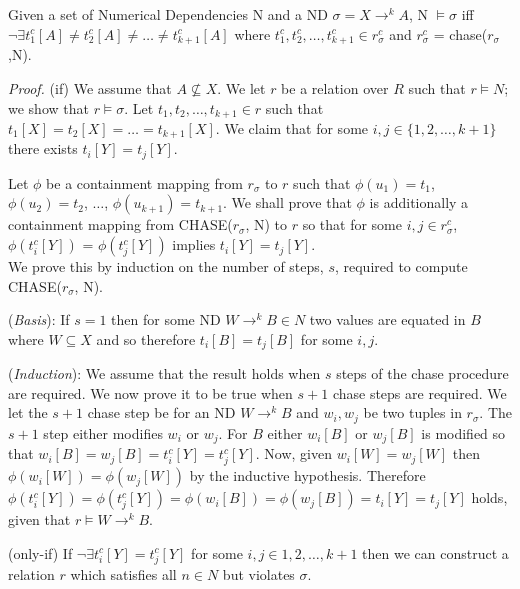 \begin{theorem}\label{th:2}
\begin{rm}
Given a set of Numerical Dependencies N and a ND $\sigma = X \to^k A$,
N $\models \sigma$ iff $\neg\exists t^c_1[A] \not= t^c_2[A] \not= \ldots
\not= t^c_{k+1}[A]$ where $t^c_1,t^c_2,\ldots,t^c_{k+1} \in
r_\sigma^c$ and $r_\sigma^c$ = chase($r_\sigma$,N).
\end{rm}
\end{theorem}

{\em Proof.} (if) We assume that $A \not\subseteq X$. We let $r$ be a
relation over $R$ such that $r \models N$; we show that $r \models
\sigma$. Let $t_1, t_2, \ldots, t_{k+1} \in r$ such that $t_1[X] =
t_2[X] = \ldots = t_{k+1}[X]$. We claim that for some $i,
j \in \{1, 2, \ldots, {k+1}\}$ there exists $t_i[Y] = t_j[Y]$.

\smallskip
Let $\phi$ be a containment mapping from $r_\sigma$ to $r$ such that
$\phi(u_1) = t_1$, $\phi(u_2) = t_2$, $\ldots$, $\phi(u_{k+1}) = t_{k+1}$. We
shall prove that $\phi$ is additionally a containment mapping from
CHASE($r_\sigma$, N) to $r$ so that for some $i,j \in r_\sigma^c$,
$\phi(t_i^c[Y])$ = $\phi(t_j^c[Y])$ implies $t_i[Y] = t_j[Y]$.\\
\smallskip
We prove this by induction on the number of steps, $s$, required to compute
CHASE($r_\sigma$, N).

\smallskip

({\em Basis}):
If $s = 1$ then for some ND $W \to^k B \in N$ two values are equated 
in $B$ where $W \subseteq X$ and so therefore 
$t_i[B] = t_j[B]$ for some $i,j$.
\smallskip
 
({\em Induction}):
We assume that the result holds when $s$ steps of the chase procedure
are required. We now prove it to be true when $s+1$ chase steps are
required. We let the $s+1$ chase step be for an ND $W \to^k B$ and
$w_i, w_j$ be two tuples in $r_\sigma$. The $s+1$ step either modifies
$w_i$ or $w_j$. For $B$ either $w_i[B]$ or
$w_j[B]$ is modified so that $w_i[B] = w_j[B] = t_i^c[Y] = t_j^c[Y]$.
Now, given $w_i[W] = w_j[W]$ then $\phi(w_i[W]) = \phi(w_j[W])$ by the
inductive hypothesis.  Therefore $\phi(t_i^c[Y]) = \phi(t_j^c[Y]) =
\phi(w_i[B]) = \phi(w_j[B]) = t_i[Y] = t_j[Y]$ holds, given that $r
\models W \to^k B$.

\smallskip

(only-if) If $\neg\exists t_i^c[Y] = t_j^c[Y]$ for some $i,j \in {1,2,
\ldots, k+1}$ then we can construct a relation $r$ which satisfies all
$n \in N$ but violates $\sigma$. 

